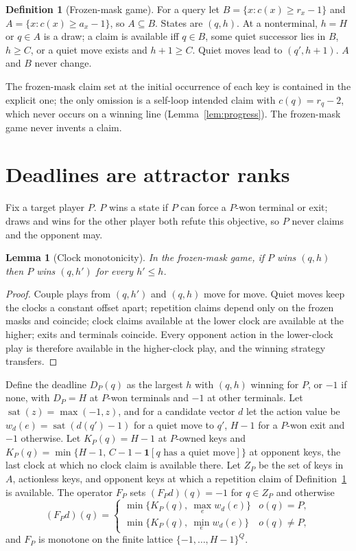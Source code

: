 \documentclass[journal]{IEEEtran}
\newtheorem{lemma}{Lemma}
\theoremstyle{definition}
\newtheorem{definition}{Definition}
\theoremstyle{remark}
\newcommand{\sat}{\operatorname{sat}}
\begin{document}
\begin{definition}[Frozen-mask game]\label{def:frozen}
For a query let $B=\{x: c(x)\ge r_x-1\}$ and $A=\{x: c(x)\ge a_x-1\}$, so $A\subseteq B$. States are $(q,h)$. At a nonterminal, $h=H$ or $q\in A$ is a draw; a claim is available iff $q\in B$, some quiet successor lies in $B$, $h\ge C$, or a quiet move exists and $h+1\ge C$. Quiet moves lead to $(q',h+1)$. $A$ and $B$ never change.
\end{definition}

The frozen-mask claim set at the initial occurrence of each key is contained in the explicit one; the only omission is a self-loop intended claim with $c(q)=r_q-2$, which never occurs on a winning line (Lemma~\ref{lem:progress}). The frozen-mask game never invents a claim.

\section{Deadlines are attractor ranks}\label{sec:rank}

Fix a target player $P$. $P$ wins a state if $P$ can force a $P$-won terminal or exit; draws and wins for the other player both refute this objective, so $P$ never claims and the opponent may.

\begin{lemma}[Clock monotonicity]\label{lem:mono}
In the frozen-mask game, if $P$ wins $(q,h)$ then $P$ wins $(q,h')$ for every $h'\le h$.
\end{lemma}
\begin{proof}
Couple plays from $(q,h')$ and $(q,h)$ move for move. Quiet moves keep the clocks a constant offset apart; repetition claims depend only on the frozen masks and coincide; clock claims available at the lower clock are available at the higher; exits and terminals coincide. Every opponent action in the lower-clock play is therefore available in the higher-clock play, and the winning strategy transfers.
\end{proof}

Define the deadline $D_P(q)$ as the largest $h$ with $(q,h)$ winning for $P$, or $-1$ if none, with $D_P=H$ at $P$-won terminals and $-1$ at other terminals. Let $\sat(z)=\max(-1,z)$, and for a candidate vector $d$ let the action value be $w_d(e)=\sat(d(q')-1)$ for a quiet move to $q'$, $H-1$ for a $P$-won exit and $-1$ otherwise. Let $K_P(q)=H-1$ at $P$-owned keys and $K_P(q)=\min\{H-1,\,C-1-\mathbf 1[q\text{ has a quiet move}]\}$ at opponent keys, the last clock at which no clock claim is available there. Let $Z_P$ be the set of keys in $A$, actionless keys, and opponent keys at which a repetition claim of Definition~\ref{def:frozen} is available. The operator $F_P$ sets $(F_Pd)(q)=-1$ for $q\in Z_P$ and otherwise
\begin{equation}\label{eq:F}
(F_Pd)(q)=\begin{cases}\min\{K_P(q),\ \max_e w_d(e)\} & o(q)=P,\\[2pt]
\min\{K_P(q),\ \min_e w_d(e)\} & o(q)\ne P,\end{cases}
\end{equation}
and $F_P$ is monotone on the finite lattice $\{-1,\dots,H-1\}^Q$.
\end{document}
